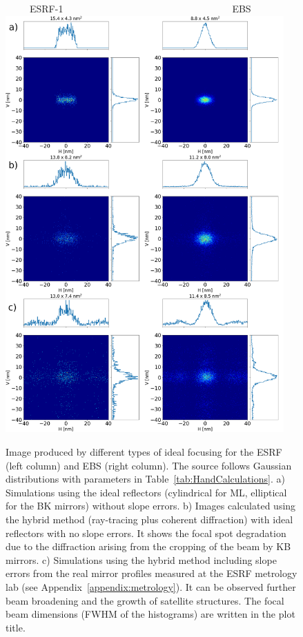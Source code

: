 \documentclass{iucr}              %
\begin{document}
\begin{figure}
\label{fig:ray-tracing}
\centering
~~~~~ESRF-1~~~~~~~~~~~~~~~~~~~~~~~~~~~~~~~~~~~EBS
\newline
\includegraphics[width=0.95\textwidth]{GRAPHICS/figure3.png}
\caption{Image produced by different types of ideal focusing for the ESRF (left column) and EBS (right column). The source follows Gaussian distributions with parameters in Table~\ref{tab:HandCalculations}. 
a) Simulations using the ideal reflectors (cylindrical for ML, elliptical for the BK mirrors) without slope errors. 
b) Images calculated using the hybrid method (ray-tracing plus coherent diffraction) with ideal reflectors with no slope errors. It shows the focal spot degradation due to the diffraction arising from the cropping of the beam by KB mirrors. c) Simulations using the hybrid method including slope errors from the real mirror profiles measured at the ESRF metrology lab (see Appendix~\ref{appendix:metrology}). It can be observed further beam broadening and the growth of satellite structures. 
The focal beam dimensions (FWHM of the histograms) are written in the plot title.
}
\end{figure}
\end{document}
